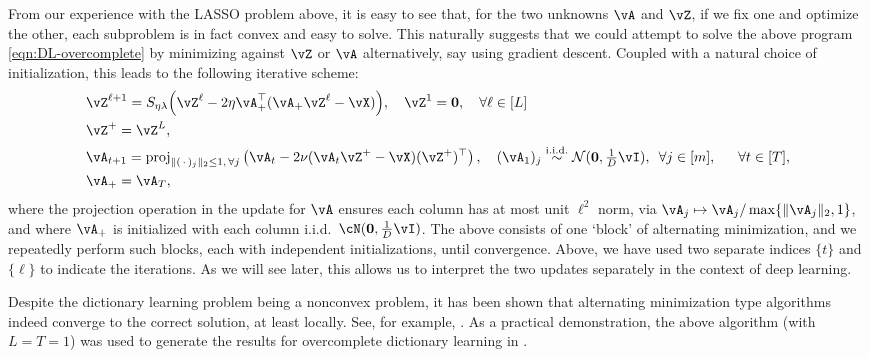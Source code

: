 \documentclass[../../book-main.tex]{subfiles}
\begin{document}
From our experience with the LASSO problem above, it is easy to see that, for
the two unknowns \(\vA\) and \(\vZ\), if we fix one and optimize the other, each
subproblem is in fact convex and easy to solve. This naturally suggests that we
could attempt to solve the above program \eqref{eqn:DL-overcomplete} by
minimizing against \(\vZ\) or \(\vA\) alternatively, say using gradient descent.
Coupled with a natural choice of initialization, this leads to the following
iterative scheme:
\begin{align}
    &\vZ^{\ell + 1} = S_{\eta\lambda}\rp{\vZ^{\ell}
    - 2\eta\vA_{+}^{\top}(\vA_{+}\vZ^{\ell} - \vX)},
    \quad \vZ^1 = \Zero,
    \quad \forall \ell \in [L] \label{eqn:ISTA-update}\\ 
    &\vZ^+ = \vZ^L,\\
    &\vA_{t + 1} = \proj_{\norm{(\,\cdot\,)_j}_2 \leq 1,\,\forall j}\left(
    \vA_{t} - 2\nu (\vA_{t}\vZ^+ - \vX)(\vZ^+)^\top
    \right), 
    \quad (\vA_{1})_j \simiid \dNorm(\vzero, \tfrac{1}{D}\vI), \enspace \forall
    j \in [m], 
    \quad\;\; \forall t \in [T],\label{eqn:DL-update}\\
    &\vA_+ = \vA_T,
\end{align}
where the projection operation in the update for $\vA$ ensures each column has
at most unit $\ell^2$ norm, via $\vA_j \mapsto \vA_j / \max \set{\norm{\vA_j}_2,
1}$, and where $\vA_+$ is initialized with each column i.i.d.\ $\cN(\Zero,
\tfrac{1}{D} \vI)$.
The above consists of one `block' of alternating minimization, and we repeatedly
perform such blocks, each with independent initializations, until convergence.
Above, we have used two separate indices $\{t\}$ and $\{\ell\}$ to indicate the
iterations. As we will see later, this allows us to interpret the two updates
separately in the context of deep learning. 

Despite the dictionary learning problem being a nonconvex problem, it has been
shown that alternating minimization type algorithms indeed converge to
the correct solution, at least locally. See, for example, \cite{alekh-2016}.
As a practical demonstration, the above algorithm (with $L = T = 1$) was used to
generate the results for overcomplete dictionary learning in
.
\end{document}
